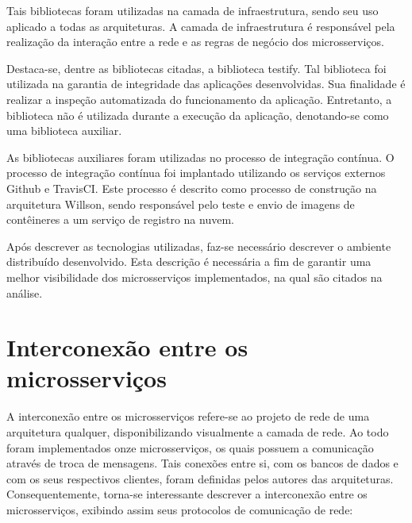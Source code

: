 Tais bibliotecas foram utilizadas na camada de infraestrutura, sendo seu uso aplicado a todas as arquiteturas.
%
A camada de infraestrutura é responsável pela realização da interação entre a rede e as regras de negócio dos microsserviços.


Destaca-se, dentre as bibliotecas citadas, a biblioteca testify.
%
Tal biblioteca foi utilizada na garantia de integridade das aplicações desenvolvidas.
%
Sua finalidade é realizar a inspeção automatizada do funcionamento da aplicação.
%
Entretanto, a biblioteca não é utilizada durante a execução da aplicação, denotando-se como uma biblioteca auxiliar.



As bibliotecas auxiliares foram utilizadas no processo de integração contínua.
%
O processo de integração contínua foi implantado utilizando os serviços externos Github e TravisCI.
%
Este processo é descrito como processo de construção na arquitetura Willson, sendo responsável pelo teste e envio de imagens de contêineres a um serviço de registro na nuvem.




Após descrever as tecnologias utilizadas, faz-se necessário descrever o ambiente distribuído desenvolvido.
Esta descrição é necessária a fim de garantir uma melhor visibilidade dos microsserviços implementados, na qual são citados na análise.



\section{Interconexão entre os microsserviços}
\label{sec:interconexao}



A interconexão entre os microsserviços refere-se ao projeto de rede de uma arquitetura qualquer, disponibilizando visualmente a camada de rede.
%
Ao todo foram implementados onze microsserviços, os quais possuem a comunicação através de troca de mensagens.
%
Tais conexões entre si, com os bancos de dados e com os seus respectivos clientes, foram definidas pelos autores das arquiteturas.
%
Consequentemente, torna-se interessante descrever a interconexão entre os microsserviços, exibindo assim seus protocolos de comunicação de rede:


